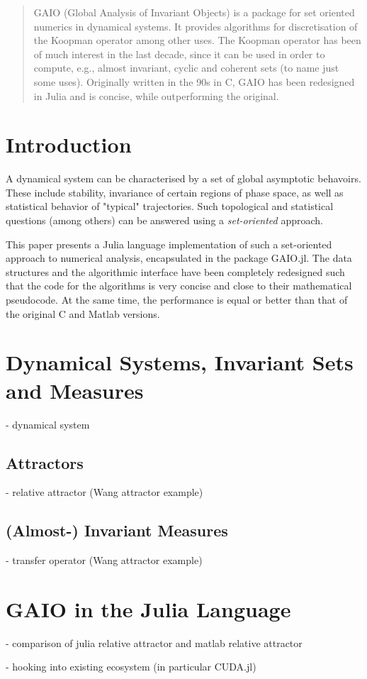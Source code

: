 \documentclass{juliacon}
\begin{document}


\maketitle

\begin{abstract}

GAIO (Global Analysis of Invariant Objects) is a package for set oriented numerics in dynamical systems. It provides algorithms for discretisation of the Koopman operator among other uses. The Koopman operator has been of much interest in the last decade, since it can be used in order to compute, e.g., almost invariant, cyclic and coherent sets (to name just some uses). Originally written in the 90s in C, GAIO has been redesigned in Julia and is concise, while outperforming the original.

\end{abstract}

\section{Introduction}

A dynamical system can be characterised by a set of global asymptotic behavoirs. These include stability, invariance of certain regions of phase space, as well as statistical behavior of "typical" trajectories. Such topological and statistical questions (among others) can be answered using a \emph{set-oriented} approach. 

This paper presents a Julia language implementation of such a set-oriented approach to numerical analysis, encapsulated in the package GAIO.jl. The data structures and the algorithmic interface have been completely redesigned such that the code for the algorithms is very concise and close to their mathematical pseudocode. At the same time, the performance is equal or better than that of the original C and Matlab versions. 

\section{Dynamical Systems, Invariant Sets and Measures}

- dynamical system

\subsection{Attractors}

- relative attractor (Wang attractor example)

\subsection{(Almost-) Invariant Measures}

- transfer operator (Wang attractor example)

\section{GAIO in the Julia Language}

- comparison of julia relative attractor and matlab relative attractor

- hooking into existing ecosystem (in particular CUDA.jl)


\end{document}
